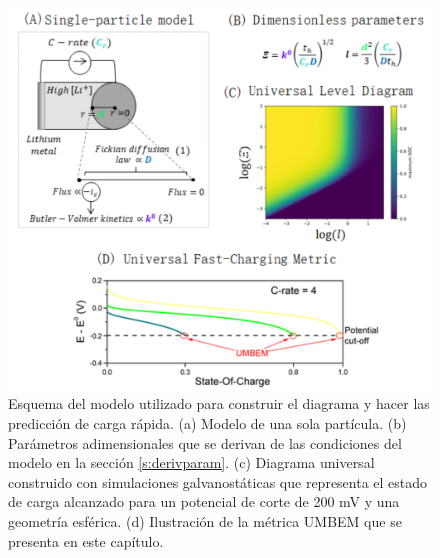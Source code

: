 \begin{figure}[h!]
    \centering
    \includegraphics[width=\textwidth]{FastCharging/umbem/explicacion.png}
    \caption{Esquema del modelo utilizado para construir el diagrama y hacer 
    las predicción de carga rápida. (a) Modelo de una sola partícula. (b) 
    Parámetros adimensionales que se derivan de las condiciones del modelo 
    en la sección \ref{s:derivparam}. (c) Diagrama universal construido con 
    simulaciones galvanostáticas que representa el estado de carga alcanzado para 
    un potencial de corte de 200 mV y una geometría esférica. (d) Ilustración
    de la métrica UMBEM que se presenta en este capítulo.}
    \label{fig:explicacion}
\end{figure}


